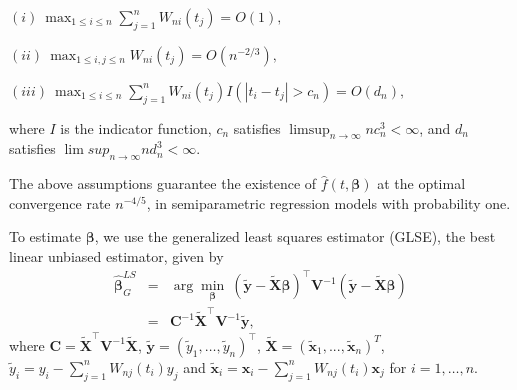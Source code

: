 \documentclass[twoside]{article}
\begin{document}
\noindent$(i)~ \max_{1\leq i\leq n}\sum_{j=1}^nW_{ni}(t_j) = O(1),$

\noindent$(ii)~\max_{1\leq i,j\leq n}W_{ni}(t_j)=O(n^{-2/3}),$

\noindent$(iii)~ \max_{1\leq i\leq n}\sum_{j=1}^nW_{ni}(t_j)I(|t_i -t_j|> c_n)=O(d_n),$

\noindent where $I$ is the indicator function, $c_n$ satisfies $\limsup_{n\rightarrow\infty}nc_n^3 < \infty$,
and $d_n$ satisfies $\lim sup_{n\rightarrow\infty}nd_n^3 < \infty$.

The above assumptions guarantee the existence of $\hat f(t,\boldsymbol\beta)$
at the optimal convergence rate $n^{-4/5}$, in semiparametric regression models with probability one.

To estimate $\boldsymbol\beta$, we use the generalized least squares estimator (GLSE), the best linear unbiased estimator,
given by
\begin{eqnarray}\label{eq23}
\hat{\boldsymbol\beta}_G^{LS}&=&\arg\min_{\boldsymbol\beta} ~(\widetilde{\boldsymbol y}-\widetilde{\boldsymbol X}\boldsymbol\beta)^\top\boldsymbol V^{-1}(\widetilde{\boldsymbol y}-\widetilde{\boldsymbol X}\boldsymbol\beta)  \nonumber\\
&=&\boldsymbol C^{-1}\widetilde{\boldsymbol X}^\top\boldsymbol V^{-1}\widetilde{\boldsymbol y},
\end{eqnarray}
where $\boldsymbol C=\widetilde{\boldsymbol X}^\top\boldsymbol V^{-1}\widetilde{\boldsymbol X}$,
$\widetilde{\boldsymbol y}=(\widetilde{y}_1,\ldots,\widetilde{y}_n)^\top$, $\widetilde{\boldsymbol X}
=(\widetilde{\boldsymbol x}_1,...,\widetilde{\boldsymbol x}_n)^T$, $\widetilde{y}_i=y_i-\sum_{j=1}^n
W_{nj}(t_i)y_j$ and $\widetilde{\boldsymbol x}_i=\boldsymbol{x}_i-\sum_{j=1}^n
W_{nj}(t_i)\boldsymbol{x}_j$ for $i= 1,\ldots,n$.
\end{document}
